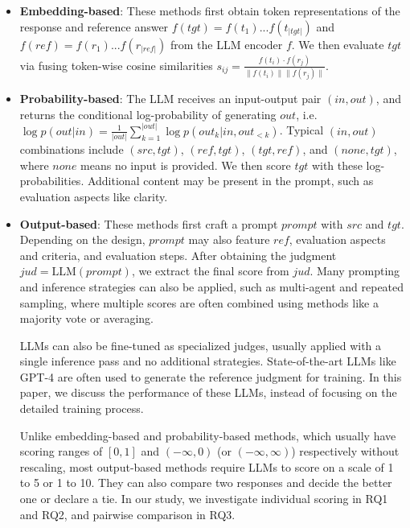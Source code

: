 \begin{itemize}
    \item \textbf{Embedding-based}: These methods first obtain token representations of the response and reference answer \(f(tgt)=f(t_1)...f(t_{|tgt|})\) and \(f(ref)=f(r_1)...f(r_{|ref|})\) from the LLM encoder \(f\). We then evaluate \(tgt\) %
    via fusing token-wise cosine similarities \(s_{ij}=\frac{f(t_i)\cdot f(r_j)}{\lVert f(t_i)\rVert\lVert f(r_j)\rVert}\). %

    \item \textbf{Probability-based}: The LLM receives an input-output pair \((in, out)\), and returns the conditional log-probability of generating \(out\), i.e. \(\log p(out|in)=\frac 1{|out|}\sum_{k=1}^{|out|}\log p(out_k|in,out_{<k})\). Typical \((in, out)\) combinations include \((src,tgt)\), \((ref,tgt)\), \((tgt,ref)\), and \((none,tgt)\), where \(none\) means no input is provided. We then score \(tgt\) with these log-probabilities. Additional content may be present in the prompt, such as evaluation aspects like clarity.

    \item \textbf{Output-based}: These methods first craft a prompt \(prompt\) with \(src\) and \(tgt\). Depending on the design, \(prompt\) may also feature \(ref\), evaluation aspects and criteria, and evaluation steps. After obtaining the judgment \(jud=\text{LLM}(prompt)\), we extract the final score from \(jud\). Many prompting and inference strategies can also be applied, such as multi-agent and repeated sampling, where multiple scores are often combined using methods like a majority vote or averaging.

    \quad LLMs can also be fine-tuned as specialized judges, usually applied with a single inference pass and no additional strategies. State-of-the-art LLMs like GPT-4 are often used to generate the reference judgment for training. In this paper, we discuss the performance of these LLMs, instead of focusing on the detailed training process.

    \quad Unlike embedding-based and probability-based methods, which usually have scoring ranges of \([0, 1]\) and \((-\infty, 0)\) (or \((-\infty, \infty)\)) respectively without rescaling, most output-based methods require LLMs to score on a scale of 1 to 5 or 1 to 10. They can also compare two responses and decide the better one or declare a tie. In our study, we investigate individual scoring in RQ1 and RQ2, and pairwise comparison in RQ3.
\end{itemize}

